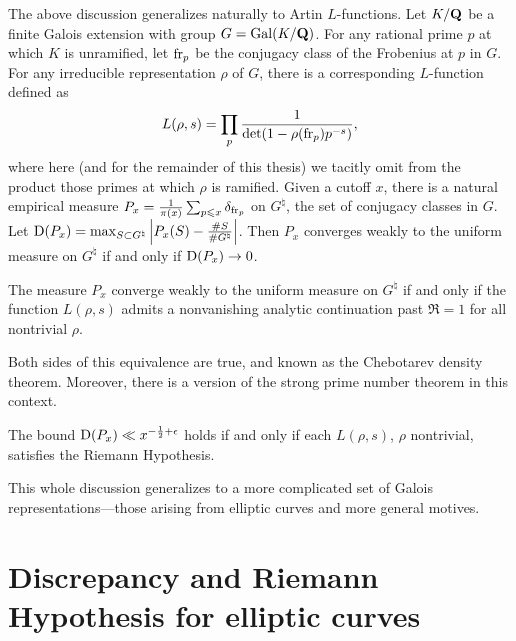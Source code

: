 The above discussion generalizes naturally to Artin $L$-functions. 
Let $K/\mathbf{Q}$ be a finite Galois extension with group $G=\operatorname{Gal}(K/\mathbf{Q})$. For any 
rational prime $p$ at which $K$ is unramified, let $\mathrm{fr}_p$ be the conjugacy 
class of the Frobenius at $p$ in $G$. For any irreducible representation 
$\rho$ of $G$, there is a corresponding $L$-function defined as 
\[
	L(\rho,s) = \prod_p \frac{1}{\det(1-\rho(\mathrm{fr}_p) p^{-s})} ,
\]
where here (and for the remainder of this thesis) we tacitly omit from the 
product those primes at which $\rho$ is ramified. Given a cutoff $x$, there is 
a natural empirical measure 
$P_x = \frac{1}{\pi(x)} \sum_{p\leqslant x} \delta_{\mathrm{fr}_p}$ on 
$G^\natural$, the set of conjugacy classes in $G$. Let 
$\operatorname{D}(P_x) = \max_{S\subset G^\natural} \left| P_x(S) - \frac{\# S}{\# G^\natural}\right|$. 
Then $P_x$ converges weakly to the uniform measure on $G^\natural$ if and 
only if $\operatorname{D}(P_x) \to 0$. 

\begin{theorem}
The measure $P_x$ converge weakly to the uniform measure on $G^\natural$ if and 
only if the function $L(\rho,s)$ admits a nonvanishing analytic continuation 
past $\Re = 1$ for all nontrivial $\rho$. 
\end{theorem}

Both sides of this equivalence are true, and known as the Chebotarev density 
theorem. Moreover, there is a version of the strong prime number theorem in 
this context. 

\begin{theorem}
The bound $\operatorname{D}(P_x) \ll x^{-\frac 1 2+\epsilon}$ holds if and only if each
$L(\rho,s)$, $\rho$ nontrivial, satisfies the Riemann Hypothesis. 
\end{theorem}

This whole discussion generalizes to a more complicated set of Galois 
representations---those arising from elliptic curves and more general motives.  





\section{Discrepancy and Riemann Hypothesis for elliptic curves}

